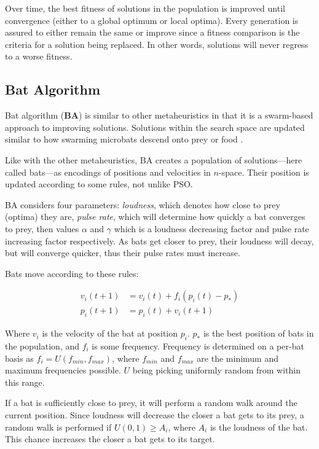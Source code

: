\documentclass[a4paper,12pt]{article}
\begin{document}
Over time, the best fitness of solutions in the population is improved until convergence (either to a global optimum or local optima). Every generation is assured to either remain the same or improve since a fitness comparison is the criteria for a solution being replaced. In other words, solutions will never regress to a worse fitness.

\subsection{Bat Algorithm}

Bat algorithm (\textbf{BA}) is similar to other metaheuristics in that it is a swarm-based approach to improving solutions. Solutions within the search space are updated similar to how swarming microbats descend onto prey or food \cite{ba}.

Like with the other metaheuristics, BA creates a population of solutions---here called bats---as encodings of positions and velocities in $n$-space. Their position is updated according to some rules, not unlike PSO.

BA considers four parameters: \textit{loudness}, which denotes how close to prey (optima) they are, \textit{pulse rate}, which will determine how quickly a bat converges to prey, then values $\alpha$ and $\gamma$ which is a loudness decreasing factor and pulse rate increasing factor respectively. As bats get closer to prey, their loudness will decay, but will converge quicker, thus their pulse rates must increase.

Bats move according to these rules:

\[
    \begin{aligned}
        v_i(t+1) &= v_i(t) + f_i(p_i(t) - p_*) \\
        p_i(t+1) &= p_i(t) + v_i(t+1)
    \end{aligned}
\]

Where $v_i$ is the velocity of the bat at position $p_i$. $p_*$ is the best position of bats in the population, and $f_i$ is some frequency. Frequency is determined on a per-bat basis as $f_i = U(f_{min}, f_{max})$, where $f_{min}$ and $f_{max}$ are the minimum and maximum frequencies possible. $U$ being picking uniformly random from within this range.

If a bat is sufficiently close to prey, it will perform a random walk around the current position. Since loudness will decrease the closer a bat gets to its prey, a random walk is performed if $U(0, 1) \geq A_i$, where $A_i$ is the loudness of the bat. This chance increases the closer a bat gets to its target.
\end{document}
